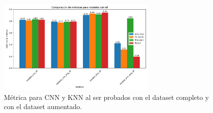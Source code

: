 \documentclass[12pt]{article} %
\begin{document}
\begin{figure}[!ht]
    \centering
    \includegraphics[width=0.7\textwidth]{comparison_all.png}
    \caption{Métrica para CNN y KNN al ser probados con el dataset completo y con el dataset aumentado.}
    \label{fig:figura1}
\end{figure}
\end{document}
